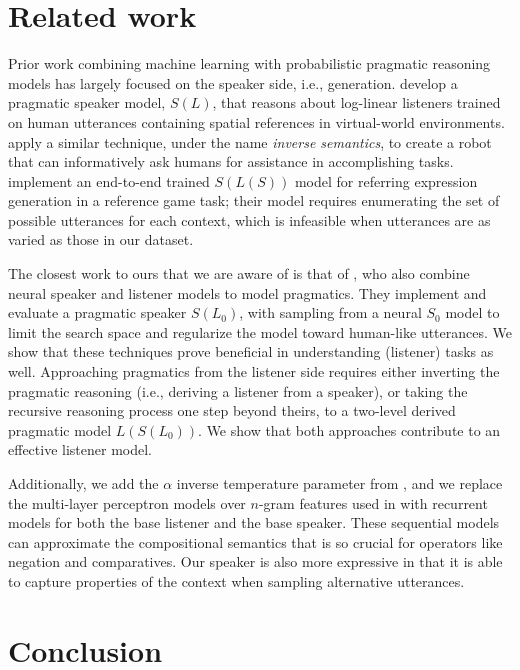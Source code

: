 \documentclass[11pt,letterpaper]{article}
\newcommand{\term}{\textit}
\newcommand{\Listener}{L}
\newcommand{\Speaker}{S}
\renewcommand{\|}{\mid}
\begin{document}
\section{Related work}

Prior work combining machine learning with probabilistic pragmatic reasoning
models has largely focused on the speaker side, i.e., generation.
 develop a pragmatic speaker model,
$\Speaker(\Listener)$, that reasons about log-linear listeners trained on human
utterances containing spatial references in virtual-world environments.
 apply a similar technique, under the name
\term{inverse semantics}, to create a robot that can informatively ask
humans for assistance in accomplishing tasks.  implement
an end-to-end trained $\Speaker(\Listener(\Speaker))$ model for referring
expression generation in a reference game task; their model requires enumerating
the set of possible utterances for each context, which is infeasible when
utterances are as varied as those in our dataset.

The closest work to ours that we are aware of is that of
, who also combine neural speaker
and listener models to model pragmatics. They implement and evaluate a
pragmatic speaker $\Speaker(\Listener_0)$, with sampling from a neural
$\Speaker_0$ model to limit the search space and regularize the model toward
human-like utterances. We show that these techniques prove beneficial in
understanding (listener) tasks as well. Approaching pragmatics from the listener
side requires either inverting the pragmatic reasoning (i.e., deriving a
listener from a speaker), or taking the recursive reasoning process one step
beyond theirs, to a two-level derived pragmatic model
$\Listener(\Speaker(\Listener_0))$. We show that both approaches contribute
to an effective listener model.

Additionally, we add the $\alpha$ inverse temperature parameter from
, and we replace the multi-layer perceptron models over
$n$-gram features used in 
with recurrent models for both the base listener and the base speaker.
These sequential models can approximate the compositional semantics
that is so crucial for operators like negation and comparatives.
Our speaker is also more expressive in that it is able to capture
properties of the context when sampling alternative utterances.

\section{Conclusion} \label{sec:conclusion}
\end{document}
